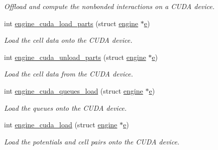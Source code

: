 \begin{DoxyCompactItemize}
\begin{DoxyCompactList}\small\item\em Offload and compute the nonbonded interactions on a C\-U\-D\-A device. \end{DoxyCompactList}\item 
int \hyperlink{runner__cuda_8cu_ab0d9b84f18b2171f13e7b563f3f023f9}{engine\-\_\-cuda\-\_\-load\-\_\-parts} (struct \hyperlink{structengine}{engine} $\ast$\hyperlink{potential__eval_8h_ac54d1391e6657558123088943f721021}{e})
\begin{DoxyCompactList}\small\item\em Load the cell data onto the C\-U\-D\-A device. \end{DoxyCompactList}\item 
int \hyperlink{runner__cuda_8cu_a24fe668d11a9f02087983cacebacc005}{engine\-\_\-cuda\-\_\-unload\-\_\-parts} (struct \hyperlink{structengine}{engine} $\ast$\hyperlink{potential__eval_8h_ac54d1391e6657558123088943f721021}{e})
\begin{DoxyCompactList}\small\item\em Load the cell data from the C\-U\-D\-A device. \end{DoxyCompactList}\item 
int \hyperlink{runner__cuda_8cu_a350f16fa3cd8830b375ea6a35d4f6628}{engine\-\_\-cuda\-\_\-queues\-\_\-load} (struct \hyperlink{structengine}{engine} $\ast$\hyperlink{potential__eval_8h_ac54d1391e6657558123088943f721021}{e})
\begin{DoxyCompactList}\small\item\em Load the queues onto the C\-U\-D\-A device. \end{DoxyCompactList}\item 
int \hyperlink{runner__cuda_8cu_a9c7e994c307502452bdb87b0e60fb9cc}{engine\-\_\-cuda\-\_\-load} (struct \hyperlink{structengine}{engine} $\ast$\hyperlink{potential__eval_8h_ac54d1391e6657558123088943f721021}{e})
\begin{DoxyCompactList}\small\item\em Load the potentials and cell pairs onto the C\-U\-D\-A device. \end{DoxyCompactList}\end{DoxyCompactItemize}
